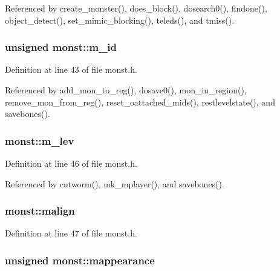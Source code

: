 Referenced by create\+\_\+monster(), does\+\_\+block(), dosearch0(), findone(), object\+\_\+detect(), set\+\_\+mimic\+\_\+blocking(), teleds(), and tmiss().

\hypertarget{structmonst_ad8084d1c794f3903b9ffa85fca798abd}{
\subsubsection[{m\+\_\+id}]{\setlength{\rightskip}{0pt plus 5cm}unsigned monst\+::m\+\_\+id}}\label{structmonst_ad8084d1c794f3903b9ffa85fca798abd}


Definition at line 43 of file monst.\+h.



Referenced by add\+\_\+mon\+\_\+to\+\_\+reg(), dosave0(), mon\+\_\+in\+\_\+region(), remove\+\_\+mon\+\_\+from\+\_\+reg(), reset\+\_\+oattached\+\_\+mids(), restlevelstate(), and savebones().

\hypertarget{structmonst_a80ec1118166ea76d347e47d088bd1f7c}{
\subsubsection[{m\+\_\+lev}]{ monst\+::m\+\_\+lev}}\label{structmonst_a80ec1118166ea76d347e47d088bd1f7c}


Definition at line 46 of file monst.\+h.



Referenced by cutworm(), mk\+\_\+mplayer(), and savebones().

\hypertarget{structmonst_a6caf08620c3b04c6ed50de20bb81e198}{
\subsubsection[{malign}]{ monst\+::malign}}\label{structmonst_a6caf08620c3b04c6ed50de20bb81e198}


Definition at line 47 of file monst.\+h.

\hypertarget{structmonst_a60ba74caeb4e779b7ccdb99150823bb9}{
\subsubsection[{mappearance}]{\setlength{\rightskip}{0pt plus 5cm}unsigned monst\+::mappearance}}\label{structmonst_a60ba74caeb4e779b7ccdb99150823bb9}


